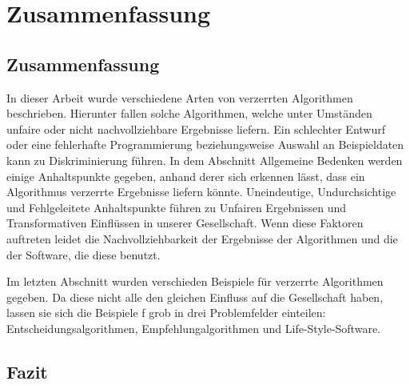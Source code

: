 \chapter{Zusammenfassung}

\section{Zusammenfassung}

In dieser Arbeit wurde verschiedene Arten von verzerrten Algorithmen beschrieben. Hierunter fallen solche Algorithmen, welche unter Umständen unfaire oder nicht nachvollziehbare Ergebnisse liefern. Ein schlechter Entwurf oder eine fehlerhafte Programmierung beziehungsweise Auswahl an Beispieldaten kann zu Diskriminierung führen. In dem Abschnitt Allgemeine Bedenken werden einige Anhaltspunkte gegeben, anhand derer sich erkennen lässt, dass ein Algorithmus verzerrte Ergebnisse liefern könnte.  
    Uneindeutige, Undurchsichtige und Fehlgeleitete Anhaltspunkte führen zu Unfairen Ergebnissen und Transformativen Einflüssen in unserer Gesellschaft.
    Wenn diese Faktoren auftreten leidet die Nachvollziehbarkeit der Ergebnisse der Algorithmen und die der Software, die diese benutzt.

Im letzten Abschnitt wurden verschieden Beispiele für verzerrte Algorithmen gegeben. Da diese nicht alle den gleichen Einfluss auf die Gesellschaft haben, lassen sie sich die Beispiele f
grob in drei Problemfelder einteilen: Entscheidungsalgorithmen, Empfehlungalgorithmen und Life-Style-Software. 

\section{Fazit}



